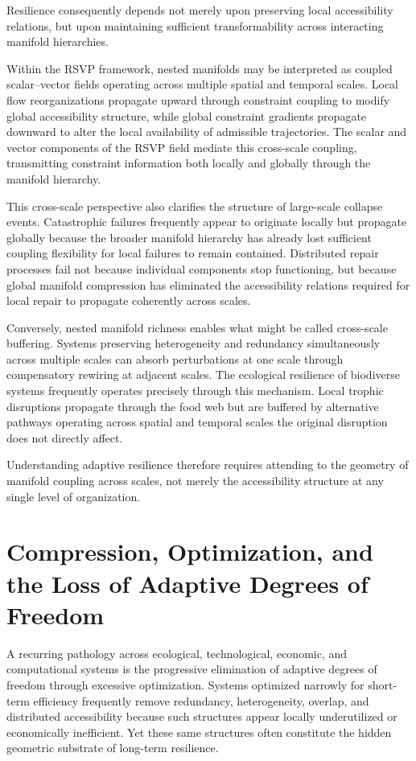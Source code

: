 \documentclass[11pt,a4paper]{article}
\begin{document}
Resilience consequently depends not merely upon preserving local accessibility relations, but upon maintaining sufficient transformability across interacting manifold hierarchies.

Within the RSVP framework, nested manifolds may be interpreted as coupled scalar--vector fields operating across multiple spatial and temporal scales. Local flow reorganizations propagate upward through constraint coupling to modify global accessibility structure, while global constraint gradients propagate downward to alter the local availability of admissible trajectories. The scalar and vector components of the RSVP field mediate this cross-scale coupling, transmitting constraint information both locally and globally through the manifold hierarchy.

This cross-scale perspective also clarifies the structure of large-scale collapse events. Catastrophic failures frequently appear to originate locally but propagate globally because the broader manifold hierarchy has already lost sufficient coupling flexibility for local failures to remain contained. Distributed repair processes fail not because individual components stop functioning, but because global manifold compression has eliminated the accessibility relations required for local repair to propagate coherently across scales.

Conversely, nested manifold richness enables what might be called cross-scale buffering. Systems preserving heterogeneity and redundancy simultaneously across multiple scales can absorb perturbations at one scale through compensatory rewiring at adjacent scales. The ecological resilience of biodiverse systems frequently operates precisely through this mechanism. Local trophic disruptions propagate through the food web but are buffered by alternative pathways operating across spatial and temporal scales the original disruption does not directly affect.

Understanding adaptive resilience therefore requires attending to the geometry of manifold coupling across scales, not merely the accessibility structure at any single level of organization.


\newpage

\section{Compression, Optimization, and the Loss of Adaptive Degrees of Freedom}

A recurring pathology across ecological, technological, economic, and computational systems is the progressive elimination of adaptive degrees of freedom through excessive optimization. Systems optimized narrowly for short-term efficiency frequently remove redundancy, heterogeneity, overlap, and distributed accessibility because such structures appear locally underutilized or economically inefficient. Yet these same structures often constitute the hidden geometric substrate of long-term resilience.
\end{document}
